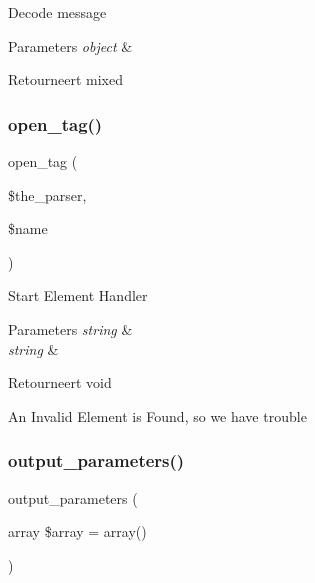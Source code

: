 Decode message


\begin{DoxyParams}{Parameters}
{\em object} & \\
\hline
\end{DoxyParams}
\begin{DoxyReturn}{Retourneert}
mixed 
\end{DoxyReturn}
\mbox{\label{class_x_m_l___r_p_c___message_a7709ec5b6f0e3769592f8afdc23b9169}} 
\subsubsection{\texorpdfstring{open\_tag()}{open\_tag()}}
{\footnotesize\ttfamily open\+\_\+tag (\begin{DoxyParamCaption}\item[{}]{\$the\+\_\+parser,  }\item[{}]{\$name }\end{DoxyParamCaption})}

Start Element Handler


\begin{DoxyParams}{Parameters}
{\em string} & \\
\hline
{\em string} & \\
\hline
\end{DoxyParams}
\begin{DoxyReturn}{Retourneert}
void 
\end{DoxyReturn}
An Invalid Element is Found, so we have trouble \mbox{\label{class_x_m_l___r_p_c___message_a763d97af7e5ff17493db7ecbd1064ba9}} 
\subsubsection{\texorpdfstring{output\_parameters()}{output\_parameters()}}
{\footnotesize\ttfamily output\+\_\+parameters (\begin{DoxyParamCaption}\item[{array}]{\$array = {\ttfamily array()} }\end{DoxyParamCaption})}

